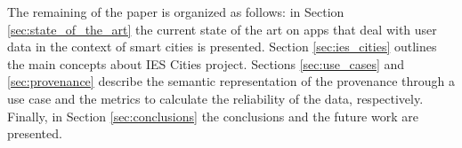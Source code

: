 The remaining of the paper is organized as follows: in Section \ref{sec:state_of_the_art} the current state of the art on apps that deal with user data in the context of smart cities is presented. Section \ref{sec:ies_cities} outlines the main concepts about IES Cities project. Sections \ref{sec:use_cases} and \ref{sec:provenance} describe the semantic representation of the provenance through a use case and the metrics to calculate the reliability of the data, respectively. Finally, in Section \ref{sec:conclusions} the conclusions and the future work are presented.
